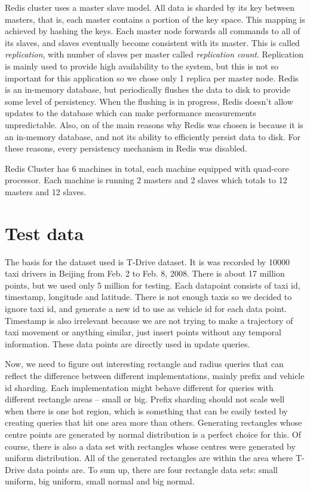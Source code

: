 \documentclass[times, utf8, diplomski]{fer}
\begin{document}
Redis cluster uses a master slave model. All data is sharded by its key between masters, that is, each master contains a portion of the key space. This mapping is achieved by hashing the keys. Each master node forwards all commands to all of its slaves, and slaves eventually become consistent with its master. This is called \emph{replication}, with number of slaves per master called \emph{replication count}. Replication is mainly used to provide high availability to the system, but this is not so important for this application so we chose only 1 replica per master node.
Redis is an in-memory database, but periodically flushes the data to disk to provide some level of persistency. When the flushing is in progress, Redis doesn't allow updates to the database which can make performance measurements unpredictable. Also, on of the main reasons why Redis was chosen is because it is an in-memory database, and not its ability to efficiently persist data to disk. For these reasons, every persistency mechanism in Redis was disabled.

Redis Cluster has 6 machines in total, each machine equipped with quad-core processor. Each machine is running 2 masters and 2 slaves which totals to 12 masters and 12 slaves. 

\section {Test data} \label{test}
The basis for the dataset used is T-Drive \citet{tdrive1, tdrive2} dataset. It is was recorded by 10000 taxi drivers in Beijing from Feb. 2 to Feb. 8, 2008. There is about 17 million points, but we used only 5 million for testing. Each datapoint consists of taxi id, timestamp, longitude and latitude. There is not enough taxis so we decided to ignore taxi id, and generate a new id to use as vehicle id for each data point. Timestamp is also irrelevant because we are not trying to make a trajectory of taxi movement or anything similar, just insert points without any temporal information. These data points are directly used in update queries.

Now, we need to figure out interesting rectangle and radius queries that can reflect the difference between different implementations, mainly prefix and vehicle id sharding. Each implementation might behave different for queries with different rectangle areas -- small or big. Prefix sharding should not scale well when there is one hot region, which is something that can be easily tested by creating queries that hit one area more than others. Generating rectangles whose centre points are generated by normal distribution is a perfect choice for this. Of course, there is also a data set with rectangles whose centres were generated by uniform distribution. All of the generated rectangles are within the area where T-Drive data points are. To sum up, there are four rectangle data sets: small uniform, big uniform, small normal and big normal.
\end{document}
